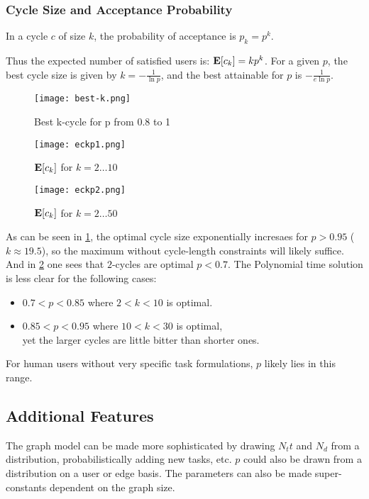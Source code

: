 \documentclass[main.tex]{subfiles}
\begin{document}
\subsubsection{Cycle Size and Acceptance Probability}

In a cycle $c$ of size $k$, the probability of acceptance is $p_k = p^k$.

Thus the expected number of satisfied users is: $\mathbf{E}[c_k] = k p^k$. For a given $p$, the best cycle size is given by $k = -\frac{1}{\ln p}$, and the best attainable for $p$ is $-\frac{1}{e \ln p}$.

\begin{figure}
  \texttt{[image: best-k.png]}
  \caption{Best k-cycle for p from 0.8 to 1}
  \label{best-k}
\end{figure}

\begin{figure}
  \texttt{[image: eckp1.png]}
  \caption{$\mathbf{E}[c_k]$ for $k = 2 \dots 10$}
  \label{eckp1}
\end{figure}

\begin{figure}
  \texttt{[image: eckp2.png]}
  \caption{$\mathbf{E}[c_k]$ for $k = 2 \dots 50$}
  \label{eckp2}
\end{figure}

As can be seen in \ref{best-k}, the optimal cycle size exponentially incresaes for $p > 0.95$ ($k \approx 19.5$), so the maximum without cycle-length constraints will likely suffice. And in \ref{eckp1} one sees that $2$-cycles are optimal $p < 0.7$. The Polynomial time solution is less clear for the following cases:
\begin{itemize}
  \item $0.7 < p < 0.85$ where $ 2 < k < 10$ is optimal.
  \item $0.85 < p < 0.95$ where $ 10 < k < 30$ is optimal,
      \\yet the larger cycles are little bitter than shorter ones.
\end{itemize}

For human users without very specific task formulations, $p$ likely lies in this range.

\subsection{Additional Features}

The graph model can be made more sophisticated by drawing $N_tt$ and $N_d$ from a distribution, probabilistically adding new tasks, etc. $p$ could also be drawn from a distribution on a user or edge basis. The parameters can also be made super-constants dependent on the graph size.
\end{document}
